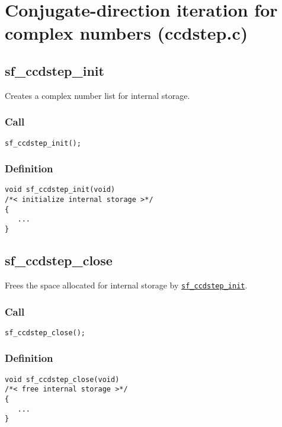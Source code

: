 \section{Conjugate-direction iteration for complex numbers (ccdstep.c)}




\subsection{{sf\_ccdstep\_init}}\label{sec:sf_ccdstep_init}
Creates a complex number list for internal storage.

\subsubsection*{Call}
\begin{verbatim}sf_ccdstep_init();\end{verbatim}

\subsubsection*{Definition}
\begin{verbatim}
void sf_ccdstep_init(void) 
/*< initialize internal storage >*/
{
   ...
}
\end{verbatim}




\subsection{{sf\_ccdstep\_close}}
Frees the space allocated for internal storage by \hyperref[sec:sf_ccdstep_init]{\texttt{sf\_ccdstep\_init}}.

\subsubsection*{Call}
\begin{verbatim}sf_ccdstep_close();\end{verbatim}

\subsubsection*{Definition}
\begin{verbatim}
void sf_ccdstep_close(void) 
/*< free internal storage >*/
{
   ...
}
\end{verbatim}




